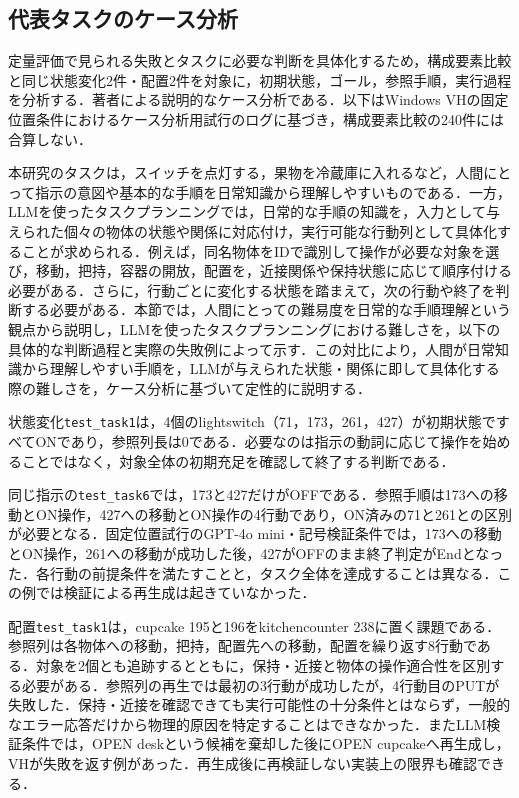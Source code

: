 \subsection{代表タスクのケース分析}\label{sec5.cases}
定量評価で見られる失敗とタスクに必要な判断を具体化するため，構成要素比較と同じ状態変化2件・配置2件を対象に，初期状態，ゴール，参照手順，実行過程を分析する．著者による説明的なケース分析である．以下はWindows VHの固定位置条件におけるケース分析用試行のログに基づき，構成要素比較の240件には合算しない．

本研究のタスクは，スイッチを点灯する，果物を冷蔵庫に入れるなど，人間にとって指示の意図や基本的な手順を日常知識から理解しやすいものである．一方，LLMを使ったタスクプランニングでは，日常的な手順の知識を，入力として与えられた個々の物体の状態や関係に対応付け，実行可能な行動列として具体化することが求められる．例えば，同名物体をIDで識別して操作が必要な対象を選び，移動，把持，容器の開放，配置を，近接関係や保持状態に応じて順序付ける必要がある．さらに，行動ごとに変化する状態を踏まえて，次の行動や終了を判断する必要がある．本節では，人間にとっての難易度を日常的な手順理解という観点から説明し，LLMを使ったタスクプランニングにおける難しさを，以下の具体的な判断過程と実際の失敗例によって示す．この対比により，人間が日常知識から理解しやすい手順を，LLMが与えられた状態・関係に即して具体化する際の難しさを，ケース分析に基づいて定性的に説明する．

状態変化\texttt{test\_task1}は，4個のlightswitch（71，173，261，427）が初期状態ですべてONであり，参照列長は0である．必要なのは指示の動詞に応じて操作を始めることではなく，対象全体の初期充足を確認して終了する判断である．

同じ指示の\texttt{test\_task6}では，173と427だけがOFFである．参照手順は173への移動とON操作，427への移動とON操作の4行動であり，ON済みの71と261との区別が必要となる．固定位置試行のGPT-4o mini・記号検証条件では，173への移動とON操作，261への移動が成功した後，427がOFFのまま終了判定がEndとなった．各行動の前提条件を満たすことと，タスク全体を達成することは異なる．この例では検証による再生成は起きていなかった．

配置\texttt{test\_task1}は，cupcake 195と196をkitchencounter 238に置く課題である．参照列は各物体への移動，把持，配置先への移動，配置を繰り返す8行動である．対象を2個とも追跡するとともに，保持・近接と物体の操作適合性を区別する必要がある．参照列の再生では最初の3行動が成功したが，4行動目のPUTが失敗した．保持・近接を確認できても実行可能性の十分条件とはならず，一般的なエラー応答だけから物理的原因を特定することはできなかった．またLLM検証条件では，OPEN deskという候補を棄却した後にOPEN cupcakeへ再生成し，VHが失敗を返す例があった．再生成後に再検証しない実装上の限界も確認できる．

